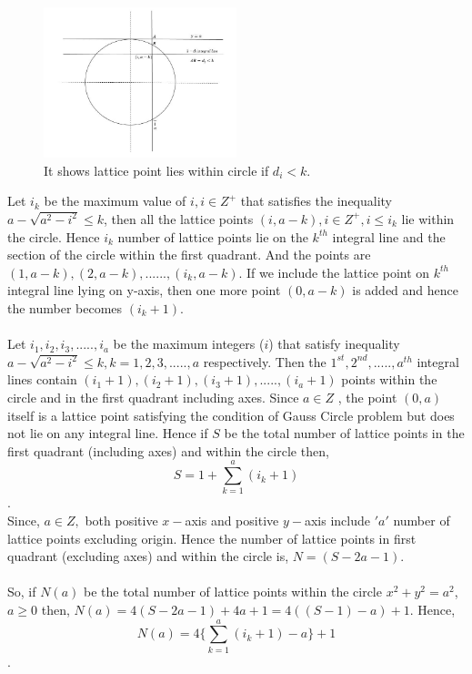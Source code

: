 \documentclass[journal,twoside]{IEEEtran}
\begin{document}
\begin{figure}[h]
\caption{It shows lattice point lies within circle if $d_{i}<k$.}
\centering
\includegraphics[width=0.5\textwidth]{diag1}
\end{figure}
Let $i_{k}$ be the maximum value of $i, i \in Z^{+}$ that satisfies the inequality $a- \sqrt{a^{2}-i^{2}} \leq k$, then all the lattice points $(i,a-k), i \in Z^{+}, i \leq i_{k}$ lie within the circle. Hence $i_{k}$ number of lattice points lie on the $k^{th}$ integral line and the section of the circle within the first quadrant. And the points are $(1,a-k), (2,a-k),......, (i_{k},a-k)$. If we include the lattice point on $k^{th}$ integral line lying on y-axis, then one more point $(0,a-k)$ is added and hence the number becomes $(i_{k}+1)$.
\\\\Let $i_{1},i_{2},i_{3},.....,i_{a}$ be the maximum integers ($i$) that satisfy inequality $a- \sqrt{a^{2}-i^{2}} \leq k, k=1,2,3,.....,a$ respectively. Then the $1^{st},2^{nd},.....,a^{th}$ integral lines contain $(i_{1}+1),(i_{2}+1),(i_{3}+1),.....,(i_{a}+1)$ points within the circle and in the first quadrant including axes. Since $a \in Z$ , the point $(0,a)$ itself is a lattice point satisfying the condition of Gauss Circle problem but does not lie on any integral line. Hence if $S$ be the total number of lattice points in the first quadrant (including axes) and within the circle then,$$ S=1+ \sum_{k=1}^{a} (i_{k}+1)$$.
\\Since, $a\in Z,$ both positive $x-$axis and positive $y-$axis include $'a'$ number of lattice points excluding origin. Hence the number of lattice points in first quadrant (excluding axes) and within the circle is, $N= (S-2a-1)$.
\\\\So, if $N(a)$ be the total number of lattice points within the circle $x^{2}+y^{2}=a^{2}$, $a \geq 0$ then,
$N(a)=4(S-2a-1)+4a+1 = 4((S-1)-a)+1$.
Hence, $$N(a)=4\bigg\{\sum_{k=1}^{a}(i_{k}+1)-a\bigg\}+1$$.
\end{document}
